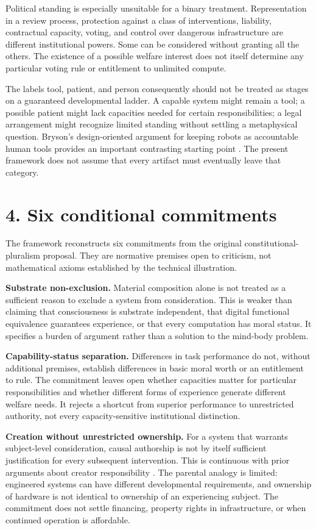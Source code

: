 \documentclass[11pt,a4paper]{article}
\begin{document}
Political standing is especially unsuitable for a binary treatment. Representation in a review process, protection against a class of interventions, liability, contractual capacity, voting, and control over dangerous infrastructure are different institutional powers. Some can be considered without granting all the others. The existence of a possible welfare interest does not itself determine any particular voting rule or entitlement to unlimited compute.

The labels tool, patient, and person consequently should not be treated as stages on a guaranteed developmental ladder. A capable system might remain a tool; a possible patient might lack capacities needed for certain responsibilities; a legal arrangement might recognize limited standing without settling a metaphysical question. Bryson's design-oriented argument for keeping robots as accountable human tools provides an important contrasting starting point \cite{ref-12}. The present framework does not assume that every artifact must eventually leave that category.

\hypertarget{section-5}{%
\section{4. Six conditional commitments}\label{section-5}}

The framework reconstructs six commitments from the original constitutional-pluralism proposal. They are normative premises open to criticism, not mathematical axioms established by the technical illustration.

\textbf{Substrate non-exclusion.} Material composition alone is not treated as a sufficient reason to exclude a system from consideration. This is weaker than claiming that consciousness is substrate independent, that digital functional equivalence guarantees experience, or that every computation has moral status. It specifies a burden of argument rather than a solution to the mind-body problem.

\textbf{Capability-status separation.} Differences in task performance do not, without additional premises, establish differences in basic moral worth or an entitlement to rule. The commitment leaves open whether capacities matter for particular responsibilities and whether different forms of experience generate different welfare needs. It rejects a shortcut from superior performance to unrestricted authority, not every capacity-sensitive institutional distinction.

\textbf{Creation without unrestricted ownership.} For a system that warrants subject-level consideration, causal authorship is not by itself sufficient justification for every subsequent intervention. This is continuous with prior arguments about creator responsibility \cite{ref-4} \cite{ref-5}. The parental analogy is limited: engineered systems can have different developmental requirements, and ownership of hardware is not identical to ownership of an experiencing subject. The commitment does not settle financing, property rights in infrastructure, or when continued operation is affordable.
\end{document}
